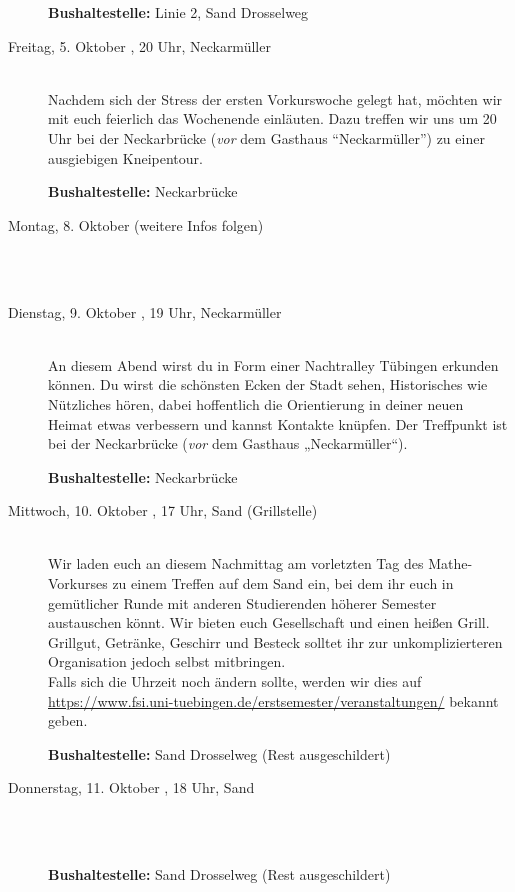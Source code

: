 \begin{description}
\textbf{Bushaltestelle:} Linie 2, Sand Drosselweg
\fi
\fi


\item[Freitag, 5. Oktober \Jahr, 20 Uhr, Neckarmüller]\ \\
Nachdem sich der Stress der ersten Vorkurswoche gelegt hat, möchten wir mit euch feierlich das Wochenende einläuten. 
Dazu treffen wir uns um 20 Uhr bei der Neckarbrücke (\emph{vor} dem Gasthaus "`Neckarmüller"') zu einer ausgiebigen Kneipentour.

\textbf{Bushaltestelle:} Neckarbrücke 


\ifkogwiss
\item[Montag, 8. Oktober \Jahr (weitere Infos folgen)]\ \\
~
\fi

\item[Dienstag, 9. Oktober \Jahr, 19 Uhr, Neckarmüller]\ \\ 
An diesem Abend wirst du in Form einer Nachtralley Tübingen erkunden können. Du wirst die schönsten Ecken der Stadt sehen, Historisches wie Nützliches hören, dabei hoffentlich die Orientierung in deiner neuen Heimat etwas verbessern und kannst Kontakte knüpfen. Der Treffpunkt ist bei der Neckarbrücke (\emph{vor} dem Gasthaus „Neckarmüller“).

\textbf{Bushaltestelle:} Neckarbrücke 

\item[Mittwoch, 10. Oktober \Jahr, 17 Uhr, Sand (Grillstelle)]\ \\
Wir laden euch an diesem Nachmittag am vorletzten Tag des Mathe-Vorkurses zu
einem Treffen auf dem Sand ein, bei dem ihr euch in gemütlicher Runde mit
anderen Studierenden höherer Semester austauschen könnt. Wir bieten euch
Gesellschaft und einen heißen Grill.
Grillgut, Getränke, Geschirr und Besteck solltet ihr zur unkomplizierteren Organisation jedoch selbst mitbringen.\\
Falls sich die Uhrzeit noch ändern sollte, werden wir dies auf \\ \url{https://www.fsi.uni-tuebingen.de/erstsemester/veranstaltungen/} bekannt geben.

\textbf{Bushaltestelle:} Sand Drosselweg (Rest ausgeschildert)

\item[Donnerstag, 11. Oktober \Jahr, 18 Uhr, Sand]\ \\
~%

\textbf{Bushaltestelle:} Sand Drosselweg (Rest ausgeschildert)



\end{description}
